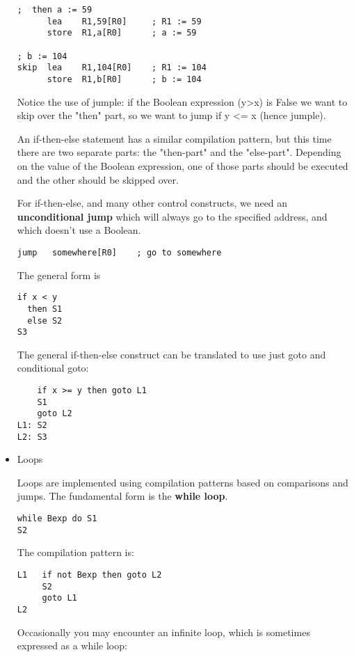 \documentclass[11pt]{article}
\begin{document}
\begin{itemize}
\begin{verbatim}
;  then a := 59
      lea    R1,59[R0]     ; R1 := 59
      store  R1,a[R0]      ; a := 59

; b := 104
skip  lea    R1,104[R0]    ; R1 := 104
      store  R1,b[R0]      ; b := 104
\end{verbatim}

Notice the use of jumple: if the Boolean expression (y>x) is False we want to
skip over the "then" part, so we want to jump if y <= x (hence jumple).

An if-then-else statement has a similar compilation pattern, but this
time there are two separate parts: the "then-part" and the
"else-part".  Depending on the value of the Boolean expression, one of
those parts should be executed and the other should be skipped over.

For if-then-else, and many other control constructs, we need an
\textbf{unconditional jump} which will always go to the specified address,
and which doesn't use a Boolean.

\begin{verbatim}
jump   somewhere[R0]    ; go to somewhere
\end{verbatim}

The general form is

\begin{verbatim}
if x < y
  then S1
  else S2
S3  
\end{verbatim}

The general if-then-else construct can be translated to use just goto
and conditional goto:

\begin{verbatim}
    if x >= y then goto L1
    S1
    goto L2
L1: S2
L2: S3
\end{verbatim}

\item Loops
\label{sec:orgcedf4b1}

Loops are implemented using compilation patterns based on comparisons
and jumps.  The fundamental form is the \textbf{while loop}.

\begin{verbatim}
while Bexp do S1
S2
\end{verbatim}

The compilation pattern is:

\begin{verbatim}
L1   if not Bexp then goto L2
     S2
     goto L1
L2
\end{verbatim}

Occasionally you may encounter an infinite loop, which is sometimes
expressed as a while loop:


\end{itemize}
\end{document}
